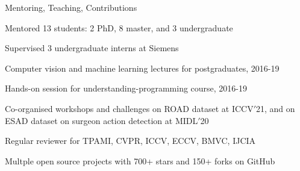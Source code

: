 \documentclass{resume} %
\begin{document}
\begin{paracol}{2}


\begin{rSection}{Mentoring, Teaching, Contributions}{} 
\begin{sSubsection}{Mentored 13 students: 2 PhD, 8 master, and 3 undergraduate} \end{sSubsection} %
\begin{sSubsection}{Supervised 3 undergraduate interns at Siemens}\end{sSubsection}
\begin{sSubsection}{Computer vision and machine learning lectures for postgraduates, 2016-19}\end{sSubsection}
\begin{sSubsection}{Hands-on session for understanding-programming course, 2016-19}\end{sSubsection}
\begin{sSubsection}{Co-organised workshops and challenges on ROAD dataset at ICCV$'$21, and on ESAD dataset on surgeon action detection at MIDL$'$20}\end{sSubsection}
\begin{sSubsection}{Regular reviewer for TPAMI, CVPR, ICCV, ECCV, BMVC, IJCIA}\end{sSubsection}
\begin{sSubsection}{Multple open source projects with 700+ stars and 150+ forks on GitHub}\end{sSubsection}
\end{rSection}


\end{paracol}
\end{document}
